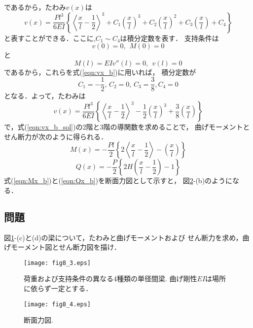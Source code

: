 \documentclass[10pt,a4j]{jbook}
\begin{document}
\begin{enumerate}
であるから，たわみ$v(x)$は
\begin{equation}
	v(x)= \frac{Pl^3}{6EI}\left\{
		\left<\frac{x}{l}-\frac{1}{2}\right>^3
		+
		C_1
		\left(\frac{x}{l}\right)^3
		+
		C_2
		\left(\frac{x}{l}\right)^2
		+
		C_3
		\left(\frac{x}{l}\right)
		+
		C_4
	\right\}
	\label{eqn:vx_b}
\end{equation}
と表すことができる．ここに,$C_1\sim C_4$は積分定数を表す．
支持条件は
\begin{equation}
	v(0)=0, \ \ M(0)=0
	\label{eqn:bcon_bl}
\end{equation}
と
\begin{equation}
	M(l)=EIv''(l)=0, \ \ v(l)=0
	\label{eqn:bcon_bl}
\end{equation}
であるから，これらを式(\ref{eqn:vx_b})に用いれば，
積分定数が
\begin{equation}
	C_1=-\frac{1}{2}, \, 
	C_2=0, \,
	C_3=\frac{3}{8}, C_4=0
\end{equation}
となる．よって，たわみは
\begin{equation}
	v(x)= \frac{Pl^3}{6EI}\left\{
		\left<\frac{x}{l}-\frac{1}{2}\right>^3
		-
		\frac{1}{2}
		\left(\frac{x}{l}\right)^3
		+
		\frac{3}{8}
		\left(\frac{x}{l}\right)
	\right\}
	\label{eqn:vx_b_sol}
\end{equation}
で，式(\ref{eqn:vx_b_sol})の2階と3階の導関数を求めることで，
曲げモーメントとせん断力が次のように得られる．
\begin{equation}
	M(x)= 
	-\frac{Pl}{2}\left\{
		2
		\left<\frac{x}{l}-\frac{1}{2}\right>
		-
		\left(\frac{x}{l}\right)
	\right\}
	\label{eqn:Mx_b}
\end{equation}
\begin{equation}
	Q(x)= 
	-\frac{P}{2}\left\{
		2H\left(\frac{x}{l}-\frac{1}{2}\right)
		-
		1
	\right\}
	\label{eqn:Qx_b}
\end{equation}
式(\ref{eqn:Mx_b})と(\ref{eqn:Qx_b})を断面力図として示すと，
図\ref{fig:fig8_4}-(b)のようになる．
\end{enumerate}
\subsection{問題}
図\ref{fig:fig8_3}-(c)と(d)の梁について，たわみと曲げモーメントおよび
せん断力を求め，曲げモーメント図とせん断力図を描け．
\begin{figure}
	\begin{center}
	\texttt{[image: fig8\_3.eps]} 
	\end{center}
	\caption{
		荷重および支持条件の異なる4種類の単径間梁.
		曲げ剛性$EI$は場所に依らず一定とする．
	 } 
	\label{fig:fig8_3}
\end{figure}
\begin{figure}
	\begin{center}
	\texttt{[image: fig8\_4.eps]} 
	\end{center}
	\caption{
		断面力図.
	 } 
	\label{fig:fig8_4}
\end{figure}
\end{document}
